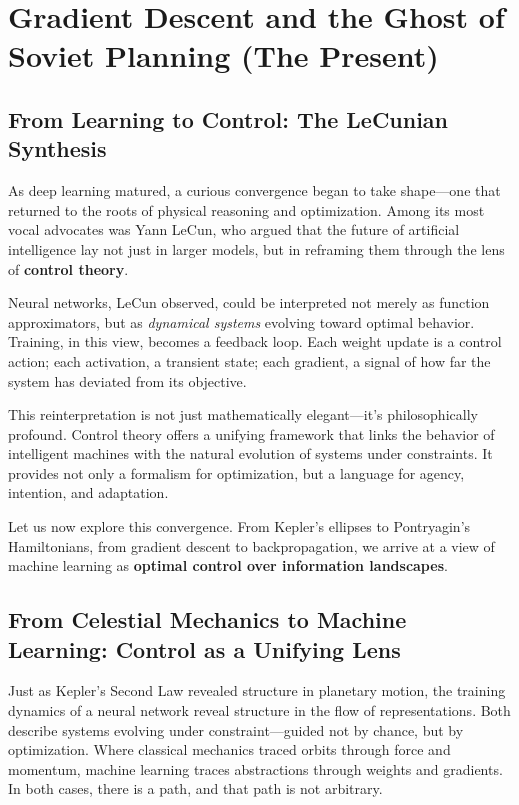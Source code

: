\section{Gradient Descent and the Ghost of Soviet Planning (The Present)}

\subsection{From Learning to Control: The LeCunian Synthesis}

As deep learning matured, a curious convergence began to take shape—one that returned to the roots of physical reasoning and optimization. Among its most vocal advocates was Yann LeCun, who argued that the future of artificial intelligence lay not just in larger models, but in reframing them through the lens of \textbf{control theory}.

Neural networks, LeCun observed, could be interpreted not merely as function approximators, but as \textit{dynamical systems} evolving toward optimal behavior. Training, in this view, becomes a feedback loop. Each weight update is a control action; each activation, a transient state; each gradient, a signal of how far the system has deviated from its objective.

This reinterpretation is not just mathematically elegant—it’s philosophically profound. Control theory offers a unifying framework that links the behavior of intelligent machines with the natural evolution of systems under constraints. It provides not only a formalism for optimization, but a language for agency, intention, and adaptation.

Let us now explore this convergence. From Kepler’s ellipses to Pontryagin’s Hamiltonians, from gradient descent to backpropagation, we arrive at a view of machine learning as \textbf{optimal control over information landscapes}.

\subsection{From Celestial Mechanics to Machine Learning: Control as a Unifying Lens}

Just as Kepler’s Second Law revealed structure in planetary motion, the training dynamics of a neural network reveal structure in the flow of representations. Both describe systems evolving under constraint—guided not by chance, but by optimization. Where classical mechanics traced orbits through force and momentum, machine learning traces abstractions through weights and gradients. In both cases, there is a path, and that path is not arbitrary.

